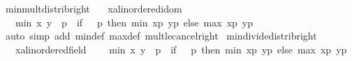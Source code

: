\begin{isabellebody}
\endisatagproof
{\isafoldproof}%
%
\isadelimproof
\isanewline
%
\endisadelimproof
\isanewline
{}\isamarkupfalse%
\ min{\isacharunderscore}{\kern0pt}mult{\isacharunderscore}{\kern0pt}distrib{\isacharunderscore}{\kern0pt}right{\isacharcolon}{\kern0pt}\isanewline
\ \ \ x{\isacharcolon}{\kern0pt}{\isacharcolon}{\kern0pt}{\isachardoublequoteopen}{\isacharprime}{\kern0pt}a{\isacharcolon}{\kern0pt}{\isacharcolon}{\kern0pt}linordered{\isacharunderscore}{\kern0pt}idom{\isachardoublequoteclose}\ \isanewline
\ \ \ {\isachardoublequoteopen}min\ x\ y\ {\isacharasterisk}{\kern0pt}\ p\ {\isacharequal}{\kern0pt}\ {\isacharparenleft}{\kern0pt}if\ {}\ {\isasymle}\ p\ then\ min\ {\isacharparenleft}{\kern0pt}x{\isacharasterisk}{\kern0pt}p{\isacharparenright}{\kern0pt}\ {\isacharparenleft}{\kern0pt}y{\isacharasterisk}{\kern0pt}p{\isacharparenright}{\kern0pt}\ else\ max\ {\isacharparenleft}{\kern0pt}x{\isacharasterisk}{\kern0pt}p{\isacharparenright}{\kern0pt}\ {\isacharparenleft}{\kern0pt}y{\isacharasterisk}{\kern0pt}p{\isacharparenright}{\kern0pt}{\isacharparenright}{\kern0pt}{\isachardoublequoteclose}\isanewline
%
\isadelimproof
%
\endisadelimproof
%
\isatagproof
{}\isamarkupfalse%
\ {\isacharparenleft}{\kern0pt}auto\ simp\ add{\isacharcolon}{\kern0pt}\ min{\isacharunderscore}{\kern0pt}def\ max{\isacharunderscore}{\kern0pt}def\ mult{\isacharunderscore}{\kern0pt}le{\isacharunderscore}{\kern0pt}cancel{\isacharunderscore}{\kern0pt}right{\isacharparenright}{\kern0pt}%
\endisatagproof
{\isafoldproof}%
%
\isadelimproof
\isanewline
%
\endisadelimproof
\isanewline
{}\isamarkupfalse%
\ min{\isacharunderscore}{\kern0pt}divide{\isacharunderscore}{\kern0pt}distrib{\isacharunderscore}{\kern0pt}right{\isacharcolon}{\kern0pt}\isanewline
\ \ \ x{\isacharcolon}{\kern0pt}{\isacharcolon}{\kern0pt}{\isachardoublequoteopen}{\isacharprime}{\kern0pt}a{\isacharcolon}{\kern0pt}{\isacharcolon}{\kern0pt}linordered{\isacharunderscore}{\kern0pt}field{\isachardoublequoteclose}\ \isanewline
\ \ \ {\isachardoublequoteopen}min\ x\ y\ {\isacharslash}{\kern0pt}\ p\ {\isacharequal}{\kern0pt}\ {\isacharparenleft}{\kern0pt}if\ {}\ {\isasymle}\ p\ then\ min\ {\isacharparenleft}{\kern0pt}x{\isacharslash}{\kern0pt}p{\isacharparenright}{\kern0pt}\ {\isacharparenleft}{\kern0pt}y{\isacharslash}{\kern0pt}p{\isacharparenright}{\kern0pt}\ else\ max\ {\isacharparenleft}{\kern0pt}x{\isacharslash}{\kern0pt}p{\isacharparenright}{\kern0pt}\ {\isacharparenleft}{\kern0pt}y{\isacharslash}{\kern0pt}p{\isacharparenright}{\kern0pt}{\isacharparenright}{\kern0pt}{\isachardoublequoteclose}\isanewline

\end{isabellebody}
